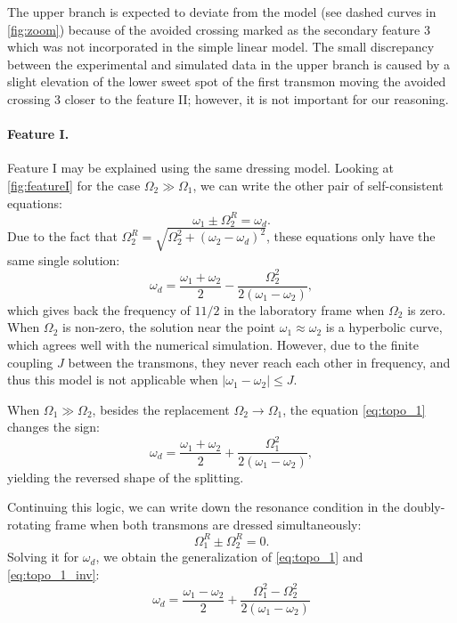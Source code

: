 \documentclass[%
 pra,
 amsmath,amssymb,
 reprint,%
]{revtex4-1}
\begin{document}
The upper branch is expected to deviate from the model (see dashed curves in \autoref{fig:zoom}) because of the avoided crossing marked as the secondary feature 3 which was not incorporated in the simple linear model. The small discrepancy between the experimental and simulated data in the upper branch is caused by a slight elevation of the lower sweet spot of the first transmon moving the avoided crossing 3 closer to the feature II; however, it is not important for our reasoning.	


\paragraph{Feature I.} Feature I may be explained using the same dressing model. Looking at \autoref{fig:featureI} for the case $\Omega_2 \gg \Omega_1$, we can write the other pair of self-consistent equations:
\begin{equation}
\omega_{1} \pm \Omega_2^R = \omega_d.
\end{equation}
Due to the fact that $\Omega_2^R = \sqrt{\Omega_2^2 + (\omega_2 - \omega_d)^2}$, these equations only have the same single solution:
\begin{equation}
\omega_d = \frac{\omega_1 + \omega_2}{2} - \frac{ \Omega_{2}^{2}}{2 \left(\omega_{1} - \omega_{2}\right)},
\label{eq:topo_1}
\end{equation}
which gives back the frequency of $11/2$ in the laboratory frame when $\Omega_2$ is zero. When $\Omega_2$ is non-zero, the solution near the point $\omega_1 \approx \omega_2$ is a hyperbolic curve, which agrees well with the numerical simulation. However, due to the finite coupling $J$ between the transmons, they never reach each other in frequency, and thus this model is not applicable when $|\omega_1 - \omega_2| \leq J$.

When $\Omega_1 \gg \Omega_2$, besides the replacement $\Omega_2 \rightarrow \Omega_1$, the equation \eqref{eq:topo_1} changes the sign:
\begin{equation}
\omega_d = \frac{\omega_1 + \omega_2}{2} + \frac{ \Omega_{1}^{2}}{2 \left(\omega_{1} - \omega_{2}\right)},
\label{eq:topo_1_inv}
\end{equation}
yielding the reversed shape of the splitting.

Continuing this logic, we can write down the resonance condition in the doubly-rotating frame when both transmons are dressed simultaneously:
\begin{equation}
\Omega_1^R \pm \Omega_2^R = 0.
\label{eq:zero-photon}
\end{equation}
Solving it for $\omega_d$, we obtain the generalization of \eqref{eq:topo_1} and \eqref{eq:topo_1_inv}:
\begin{equation}
\omega_d = \frac{\omega_{1} - \omega_{2}}{2} + \frac{\Omega_{1}^{2} - \Omega_{2}^{2}}{ 2\left(\omega_{1} - \omega_{2}\right)}
\label{eq:topo_comm}
\end{equation}
\end{document}
